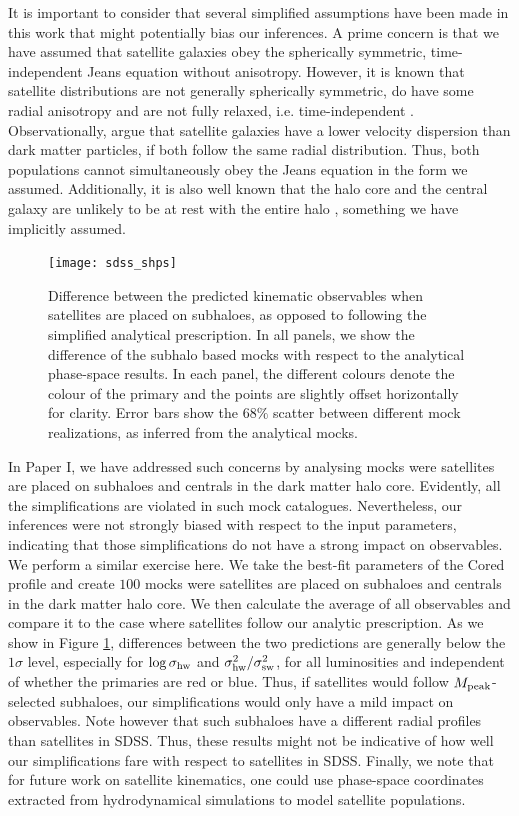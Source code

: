 \documentclass[fleqn,usenatbib,useAMS]{mnras}
\begin{document}
It is important to consider that several simplified assumptions have been made in this work that might potentially bias our inferences. A prime concern is that we have assumed that satellite galaxies obey the spherically symmetric, time-independent Jeans equation without anisotropy. However, it is known that satellite distributions are not generally spherically symmetric, do have some radial anisotropy \citep{Diemand+04, Wojtak+13} and are not fully relaxed, i.e. time-independent \citep{Ye+17}. Observationally, \cite{Guo+15a, Guo+15b} argue that satellite galaxies have a lower velocity dispersion than dark matter particles, if both follow the same radial distribution. Thus, both populations cannot simultaneously obey the Jeans equation in the form we assumed. Additionally, it is also well known that the halo core and the central galaxy are unlikely to be at rest with the entire halo \citep{vdBosch+05a, Behroozi+13, Guo+15a, Guo+15b, Guo+16, Ye+17}, something we have implicitly assumed.

\begin{figure}
	\centering
	\texttt{[image: sdss\_shps]}
	\caption{Difference between the predicted kinematic observables when satellites are placed on subhaloes, as opposed to following the simplified analytical prescription. In all panels, we show the difference of the subhalo based mocks with respect to the analytical phase-space results. In each panel, the different colours denote the colour of the primary and the points are slightly offset horizontally for clarity. Error bars show the $68\%$ scatter between different mock realizations, as inferred from the analytical mocks.}
	\label{fig:shps}
\end{figure}

In Paper I, we have addressed such concerns by analysing mocks were satellites are placed on subhaloes and centrals in the dark matter halo core. Evidently, all the simplifications are violated in such mock catalogues. Nevertheless, our inferences were not strongly biased with respect to the input parameters, indicating that those simplifications do not have a strong impact on observables. We perform a similar exercise here. We take the best-fit parameters of the Cored profile and create $100$ mocks were satellites are placed on subhaloes and centrals in the dark matter halo core. We then calculate the average of all observables and compare it to the case where satellites follow our analytic prescription. As we show in Figure \ref{fig:shps}, differences between the two predictions are generally below the $1\sigma$ level, especially for $\log \sigma_{\rm hw}$ and $\sigma_{\rm hw}^2 / \sigma_{\rm sw}^2$, for all luminosities and independent of whether the primaries are red or blue. Thus, if satellites would follow $M_{\rm peak}$-selected subhaloes, our simplifications would only have a mild impact on observables. Note however that such subhaloes have a different radial profiles than satellites in SDSS. Thus, these results might not be indicative of how well our simplifications fare with respect to satellites in SDSS. Finally, we note that for future work on satellite kinematics, one could use phase-space coordinates extracted from hydrodynamical simulations to model satellite populations.
\end{document}

